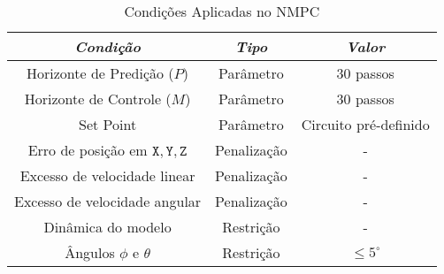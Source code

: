 \begin{table}[h!]
    \centering
    \caption{Condições Aplicadas no NMPC}
    \label{tab:nmpc_params}
    \begin{tabular}{|c|c|c|}
        \hline
        \emph{Condição}                            & \emph{Tipo}              & \emph{Valor}          \\ \hline
        Horizonte de Predição ($P$)                & Parâmetro                & 30 passos               \\ \hline
        Horizonte de Controle ($M$)                & Parâmetro                & 30 passos               \\ \hline
        Set Point                                  & Parâmetro                & Circuito pré-definido   \\ \hline
        Erro de posição em $\mathtt{X, Y, Z}$      & Penalização              & -                       \\ \hline
        Excesso de velocidade linear               & Penalização              & -                       \\ \hline
        Excesso de velocidade angular              & Penalização              & -                       \\ \hline
        Dinâmica do modelo                         & Restrição                & -                       \\ \hline
        Ângulos $\phi$ e $\theta$  & Restrição                & $\leq 5^{\circ}$               \\ \hline
    \end{tabular}
\end{table}

\pagebreak

